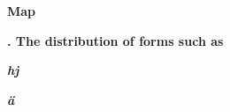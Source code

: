 \begin{stylecaption}
\label{bkm:Ref176928280}

\end{stylecaption}

\begin{figure}[h]

\begin{minipage}{5.8752in}

\bfseries
Map 

\end{minipage}

\end{figure}

\begin{stylecaption}

\end{stylecaption}

\begin{figure}[h]

\begin{minipage}{5.8752in}

\bfseries
. The distribution of forms such as 

\end{minipage}

\end{figure}

\begin{stylecaption}

\end{stylecaption}

\begin{figure}[h]

\begin{minipage}{5.8752in}

\bfseries\itshape
hj

\end{minipage}

\end{figure}

\begin{stylecaption}

\end{stylecaption}

\begin{figure}[h]

\begin{minipage}{5.8752in}

\bfseries\itshape
ä

\end{minipage}

\end{figure}

